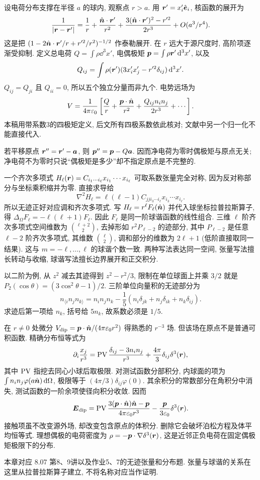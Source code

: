 设电荷分布支撑在半径 $a$ 的球内, 观察点 $r>a$. 用 $\boldsymbol{r}'=x'_i\hat{\boldsymbol{e}}_i$, 核函数的展开为
\[
\frac1{|\boldsymbol{r}-\boldsymbol{r}'|}=\frac1r+\frac{\hat{\boldsymbol{n}}\cdot\boldsymbol{r}'}{r^2}
+\frac{3(\hat{\boldsymbol{n}}\cdot\boldsymbol{r}')^2-r'^2}{2r^3}+O(a^3/r^4).
\]
这是把 $(1-2\hat{\boldsymbol{n}}\cdot\boldsymbol{r}'/r+r'^2/r^2)^{-1/2}$ 作泰勒展开. 在 $r$ 远大于源尺度时, 高阶项逐渐受抑制. 定义总电荷 $Q=\int\rho\dd^3x'$, 电偶极矩 $\boldsymbol{p}=\int\rho\boldsymbol{r}'\,\mathrm d^3x'$, 以及
\[
Q_{ij}=\int\rho(\boldsymbol{r}')(3x'_ix'_j-r'^2\delta_{ij})\,\mathrm d^3x'.
\]
$Q_{ij}=Q_{ji}$ 且 $Q_{ii}=0$, 所以五个独立分量而非九个. 电势远场为
\[
V=\frac1{4\pi\varepsilon_0}\left[\frac Qr+\frac{\boldsymbol{p}\cdot\hat{\boldsymbol{n}}}{r^2}
+\frac{Q_{ij}n_in_j}{2r^3}+\cdots\right].
\]
本稿用带系数3的四极矩定义, 后文所有四极系数依此核对; 文献中另一个归一化不能直接代入.

若平移原点 $\boldsymbol{r}''=\boldsymbol{r}'-\boldsymbol{a}$, 则 $\boldsymbol{p}''=\boldsymbol{p}-Q\boldsymbol{a}$. 因而净电荷为零时偶极矩与原点无关; 净电荷不为零时只说“偶极矩是多少”却不指定原点是不完整的.

一个齐次多项式 $H_\ell(\boldsymbol{r})=C_{i_1\cdots i_\ell}x_{i_1}\cdots x_{i_\ell}$ 可取系数张量完全对称, 因为反对称部分与坐标乘积缩并为零. 直接求导给
\[
\nabla^2H_\ell=\ell(\ell-1)C_{jj i_3\cdots i_\ell}x_{i_3}\cdots x_{i_\ell}.
\]
所以无迹正好对应调和齐次多项式. 写 $H_\ell=r^\ell F_\ell(\hat{\boldsymbol{n}})$ 并代入球坐标拉普拉斯算子, 得 $\Delta_\Omega F_\ell=-\ell(\ell+1)F_\ell$. 因此 $F_\ell$ 是同一阶球谐函数的线性组合. 三维 $\ell$ 阶齐次多项式空间维数为 $\binom{\ell+2}2$, 去掉形如 $r^2P_{\ell-2}$ 的迹部分, 其中 $P_{\ell-2}$ 是任意 $\ell-2$ 阶齐次多项式, 其维数 $\binom\ell2$, 调和部分的维数为 $2\ell+1$ (低阶直接取同一结果). 这与 $m=-\ell,\ldots,\ell$ 的球谐个数一致. 两种写法表达同一空间, 张量写法擅长转动与收缩, 球谐写法擅长边界展开和正交积分.

以二阶为例, 从 $z^2$ 减去其迹得到 $z^2-r^2/3$, 限制在单位球面上并乘 $3/2$ 就是 $P_2(\cos\theta)=(3\cos^2\theta-1)/2$. 三阶单位向量积的无迹部分为
\[
n_{\langle i}n_jn_{k\rangle}=n_in_jn_k-\frac15(n_i\delta_{jk}+n_j\delta_{ik}+n_k\delta_{ij}).
\]
求迹后第一项给 $n_k$, 括号给 $5n_k$, 故系数必须是 $1/5$.

在 $r\ne0$ 处微分 $V_\mathrm{dip}=\boldsymbol{p}\cdot\hat{\boldsymbol{n}}/(4\pi\varepsilon_0 r^2)$ 得熟悉的 $r^{-3}$ 场. 但该场在原点不是普通可积函数. 精确分布恒等式为
\[
\partial_i\frac{x_j}{r^3}=\operatorname{PV}\frac{\delta_{ij}-3n_in_j}{r^3}+\frac{4\pi}3\delta_{ij}\delta^3(\boldsymbol{r}),
\]
其中 $\operatorname{PV}$ 指挖去同心小球后取极限. 对测试函数分部积分, 内球面的项为 $\int n_in_j\varphi(a\hat{\boldsymbol{n}})\,\mathrm d\Omega$, 极限等于 $(4\pi/3)\delta_{ij}\varphi(0)$. 其余积分的常数部分在角积分中消失, 测试函数的一阶余项使径向积分收敛. 因而
\[
\boldsymbol{E}_\mathrm{dip}=\operatorname{PV}\frac{3(\boldsymbol{p}\cdot\hat{\boldsymbol{n}})\hat{\boldsymbol{n}}-\boldsymbol{p}}{4\pi\varepsilon_0 r^3}
-\frac{\boldsymbol{p}}{3\varepsilon_0}\delta^3(\boldsymbol{r}).
\]
接触项虽不改变源外场, 却改变包含原点的体积分. 删除它会破坏泊松方程及体平均恒等式. 理想偶极的电荷密度为 $\rho=-\boldsymbol{p}\cdot\nabla\delta^3(\boldsymbol{r})$, 这是近邻正负电荷在固定偶极矩极限下的分布.

本章对应 8.07 第8、9讲以及作业5、7的无迹张量和分布题. 张量与球谐的关系在这里从拉普拉斯算子建立, 不将名称对应当作证明.
